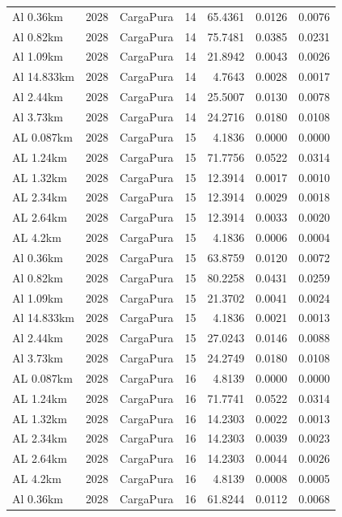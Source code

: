 \documentclass[11pt,a4paper]{article}
\begin{document}
\begin{longtable}{llllrrr}
Al 0.36km & 2028 & CargaPura & 14 & 65.4361 & 0.0126 & 0.0076 \\
Al 0.82km & 2028 & CargaPura & 14 & 75.7481 & 0.0385 & 0.0231 \\
Al 1.09km & 2028 & CargaPura & 14 & 21.8942 & 0.0043 & 0.0026 \\
Al 14.833km & 2028 & CargaPura & 14 & 4.7643 & 0.0028 & 0.0017 \\
Al 2.44km & 2028 & CargaPura & 14 & 25.5007 & 0.0130 & 0.0078 \\
Al 3.73km & 2028 & CargaPura & 14 & 24.2716 & 0.0180 & 0.0108 \\
AL 0.087km & 2028 & CargaPura & 15 & 4.1836 & 0.0000 & 0.0000 \\
AL 1.24km & 2028 & CargaPura & 15 & 71.7756 & 0.0522 & 0.0314 \\
AL 1.32km & 2028 & CargaPura & 15 & 12.3914 & 0.0017 & 0.0010 \\
AL 2.34km & 2028 & CargaPura & 15 & 12.3914 & 0.0029 & 0.0018 \\
AL 2.64km & 2028 & CargaPura & 15 & 12.3914 & 0.0033 & 0.0020 \\
AL 4.2km & 2028 & CargaPura & 15 & 4.1836 & 0.0006 & 0.0004 \\
Al 0.36km & 2028 & CargaPura & 15 & 63.8759 & 0.0120 & 0.0072 \\
Al 0.82km & 2028 & CargaPura & 15 & 80.2258 & 0.0431 & 0.0259 \\
Al 1.09km & 2028 & CargaPura & 15 & 21.3702 & 0.0041 & 0.0024 \\
Al 14.833km & 2028 & CargaPura & 15 & 4.1836 & 0.0021 & 0.0013 \\
Al 2.44km & 2028 & CargaPura & 15 & 27.0243 & 0.0146 & 0.0088 \\
Al 3.73km & 2028 & CargaPura & 15 & 24.2749 & 0.0180 & 0.0108 \\
AL 0.087km & 2028 & CargaPura & 16 & 4.8139 & 0.0000 & 0.0000 \\
AL 1.24km & 2028 & CargaPura & 16 & 71.7741 & 0.0522 & 0.0314 \\
AL 1.32km & 2028 & CargaPura & 16 & 14.2303 & 0.0022 & 0.0013 \\
AL 2.34km & 2028 & CargaPura & 16 & 14.2303 & 0.0039 & 0.0023 \\
AL 2.64km & 2028 & CargaPura & 16 & 14.2303 & 0.0044 & 0.0026 \\
AL 4.2km & 2028 & CargaPura & 16 & 4.8139 & 0.0008 & 0.0005 \\
Al 0.36km & 2028 & CargaPura & 16 & 61.8244 & 0.0112 & 0.0068 \\

\end{longtable}
\end{document}

